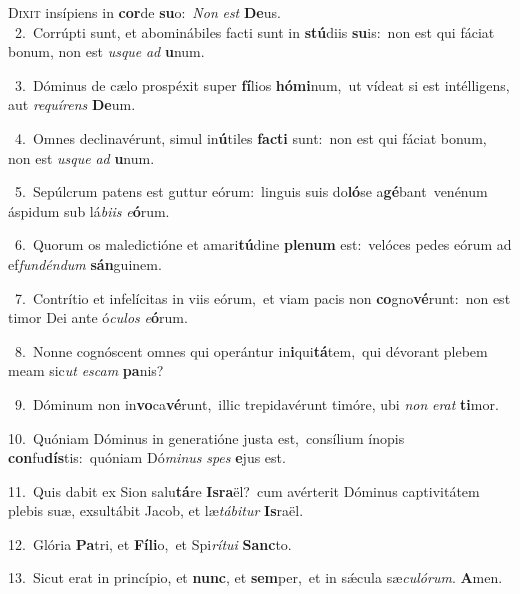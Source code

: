 \lettrine{\initial\textcolor{\initialcolor}{D}}{ixit} insípiens in \textbf{cor}\-de \textbf{su}\-o:~\star \textit{Non} \textit{est} \textbf{De}\-us.\\
{\numbfont\textcolor{\numbcolor}{~2.}}~Corrúpti sunt, et abominábiles facti sunt in \textbf{stú}\-diis \textbf{su}\-is:~\star non est qui fáciat bonum, non est \textit{us}\-\textit{que} \textit{ad} \textbf{u}\-num.\par
{\numbfont\textcolor{\numbcolor}{~3.}}~Dóminus de cælo prospéxit super \textbf{fí}\-lios \textbf{hó}\-\textbf{mi}num,~\star ut vídeat si est intélligens, aut \textit{re}\-\textit{quí}\textit{rens} \textbf{De}\-um.\par
{\numbfont\textcolor{\numbcolor}{~4.}}~Omnes declinavérunt, simul in\-\textbf{ú}\-tiles \textbf{fac}\-\textbf{ti} sunt:~\star non est qui fáciat bonum, non est \textit{us}\-\textit{que} \textit{ad} \textbf{u}\-num.\par
{\numbfont\textcolor{\numbcolor}{~5.}}~Sepúlcrum patens est guttur eórum:~\dagger linguis suis do\-\textbf{ló}\-se a\-\textbf{gé}\-bant~\star venénum áspidum sub lá\-\textit{bi}\-\textit{is} \textit{e}\-\textbf{ó}rum.\par
{\numbfont\textcolor{\numbcolor}{~6.}}~Quorum os maledictióne et amari\-\textbf{tú}\-dine \textbf{ple}\-\textbf{num} est:~\star velóces pedes eórum ad ef\-\textit{fun}\-\textit{dén}\textit{dum} \textbf{sán}\-guinem.\par
{\numbfont\textcolor{\numbcolor}{~7.}}~Contrítio et infelícitas in viis eórum,~\dagger et viam pacis non \textbf{co}\-gno\-\textbf{vé}\-runt:~\star non est timor Dei ante ó\-\textit{cu}\-\textit{los} \textit{e}\-\textbf{ó}rum.\par
{\numbfont\textcolor{\numbcolor}{~8.}}~Nonne cognóscent omnes qui operántur in\-\textbf{i}\-qui\-\textbf{tá}\-tem,~\star qui dévorant plebem meam sic\textit{ut} \textit{es}\-\textit{cam} \textbf{pa}\-nis?\par
{\numbfont\textcolor{\numbcolor}{~9.}}~Dóminum non in\-\textbf{vo}\-ca\-\textbf{vé}\-runt,~\star illic trepidavérunt timóre, ubi \textit{non} \textit{e}\-\textit{rat} \textbf{ti}\-mor.\par
{\numbfont\textcolor{\numbcolor}{10.}}~Quóniam Dóminus in generatióne justa est,~\dagger consílium ínopis \textbf{con}\-fu\-\textbf{dís}\-tis:~\star quóniam Dó\-\textit{mi}\-\textit{nus} \textit{spes} \textbf{e}\-jus est.\par
{\numbfont\textcolor{\numbcolor}{11.}}~Quis dabit ex Sion salu\-\textbf{tá}\-re \textbf{Is}\-\textbf{ra}ël?~\star cum avérterit Dóminus captivitátem plebis suæ, exsultábit Jacob, et læ\-\textit{tá}\-\textit{bi}\textit{tur} \textbf{Is}\-raël.\par
{\numbfont\textcolor{\numbcolor}{12.}}~Glória \textbf{Pa}\-tri, et \textbf{Fí}\-\textbf{li}o,~\star et Spi\-\textit{rí}\-\textit{tu}\textit{i} \textbf{Sanc}\-to.\par
{\numbfont\textcolor{\numbcolor}{13.}}~Sicut erat in princípio, et \textbf{nunc}\-, et \textbf{sem}\-per,~\star et in sǽcula sæ\-\textit{cu}\-\textit{ló}\textit{rum}. \textbf{A}\-men.\par
